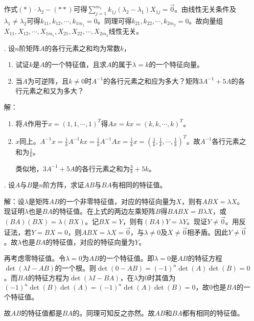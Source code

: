 \documentclass[10pt,twocolumn,letterpaper]{article}
\theoremstyle{mythmstyle}
\begin{document}
作式$(*)\cdot \lambda_2 - (**)$可得$\sum_{j = 1}^{m_1} k_{1j} (\lambda_2 - \lambda_1)X_{1j} = \vec{0}$。由线性无关条件及$\lambda_1 \neq \lambda_2$可得$k_{11}, k_{12}, \cdots, k_{1m_1} = 0$。同理可得$k_{21}, k_{22}, \cdots, k_{2m_2} = 0$。故向量组$X_{11}, X_{12}, \cdots, X_{1m_1}, X_{21}, X_{22}, \cdots, X_{2m_2}$线性无关。

\vspace{1em}
. 设$n$阶矩阵$A$的各行元素之和均为常数$k$，
\begin{enumerate}[(1)]
    \item 试证$k$是$A$的一个特征值，且求$A$的属于$\lambda = k$的一个特征向量。
    \item 当$A$为可逆阵，且$k \neq 0$时$A^{-1}$的各行元素之和应为多大？矩阵$3A^{-1} + 5 A$的各行元素之和又为多大？
\end{enumerate}

\noindent 解：
\begin{enumerate}
    \item 将$A$作用于$x = (1, 1, \cdots, 1)^T$得$A x = k x = (k, k, \cdots, k)^T$。
    
    \item $x$同上。$A^{-1} x = \frac{1}{k} A^{-1} k x = \frac{1}{k} A^{-1} A x = \frac{1}{k} x = (\frac{1}{k}, \frac{1}{k}, \cdots, \frac{1}{k})^T$。故$A^{-1}$各行元素之和为$\frac{1}{k}$。
    
    类似地，$3A^{-1} + 5 A$的各行元素之和为$\frac{3}{k} + 5k$。
\end{enumerate}

\vspace{1em}
. 设$A$与$B$是$n$阶方阵，求证$A B$与$B A$有相同的特征值。

\noindent 解：设$\lambda$是矩阵$AB$的一个非零特征值，对应的特征向量为$X$，则有$A B X = \lambda X$。现证明$\lambda$也是$B A$的特征值。在上式的两边左乘矩阵$B$得$B A B X = B \lambda X$，或$(B A) (B X) = \lambda (B X)$。记$B X = Y$，则有$(B A) Y = \lambda Y$。现证$Y \neq \vec 0$。用反证法，若$Y = BX = 0$，则$A B X = \lambda X = \vec 0$，与$\lambda \neq 0$及$X \neq \vec 0$相矛盾。因此$Y \neq \vec 0$。故$\lambda$也是$B A$的特征值，对应的特征向量为$Y$。

再考虑零特征值。令$\lambda = 0$为$A B$的一个特征值。即$\lambda = 0$是$A B$的特征方程$\det(\lambda I - A B)$的一个根。则$\det(0 - AB) = (-1)^n \det(A) \det(B) = 0$。而$B A$的特征方程为$\det(\lambda I - B A)$，在$\lambda$为$0$时其值为$(-1)^n \det(B) \det(A) = (-1)^n \det(A) \det(B) = 0$，故$0$也是$B A$的一个特征值。

故$A B$的特征值都是$B A$的。同理可知反之亦然。故$A B$和$B A$都有相同的特征值。
\end{document}

